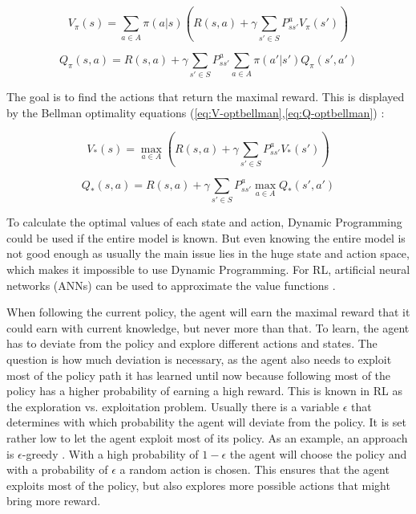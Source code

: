 \begin{equation}
\label{eq:V-bellman}
V_\pi (s) = \sum_{a \in A}  \pi(a|s) (R(s,a) + \gamma \sum_{s' \in S} P_{ss'}^a V_\pi (s'))
\end{equation}

\begin{equation}
\label{eq:Q-bellman}
Q_\pi (s,a) = R(s,a) + \gamma \sum_{s' \in S} P_{ss'}^a \sum_{a \in A}  \pi(a'|s') Q_\pi(s',a')
\end{equation}

The goal is to find the actions that return the maximal reward. This is displayed by the Bellman optimality equations (\ref{eq:V-optbellman},\ref{eq:Q-optbellman}) \cite{rllilianweng}:

\begin{equation}
\label{eq:V-optbellman}
V_\ast (s) = \max_{a \in A} (R(s,a) + \gamma \sum_{s' \in S} P_{ss'}^a V_\ast (s'))
\end{equation}

\begin{equation}
\label{eq:Q-optbellman}
Q_\ast (s,a) = R(s,a) + \gamma \sum_{s' \in S} P_{ss'}^a \max_{a \in A} Q_\ast(s',a')
\end{equation}

To calculate the optimal values of each state and action, Dynamic Programming could be used if the entire model is known. But even knowing the entire model is not good enough as usually the main issue lies in the huge state and action space, which makes it impossible to use Dynamic Programming. For RL, artificial neural networks (ANNs) can be used to approximate the value functions \cite{neuralnetpath}. 

When following the current policy, the agent will earn the maximal reward that it could earn with current knowledge, but never more than that. To learn, the agent has to deviate from the policy and explore different actions and states. The question is how much deviation is necessary, as the agent also needs to exploit most of the policy path it has learned until now because following most of the policy has a higher probability of earning a high reward. This is known in RL as the exploration vs. exploitation problem. Usually there is a variable $\epsilon$ that determines with which probability the agent will deviate from the policy. It is set rather low to let the agent exploit most of its policy. As an example, an approach is $\epsilon$-greedy \cite{egreedy}. With a high probability of $1-\epsilon$ the agent will choose the policy and with a probability of $\epsilon$ a random action is chosen. This ensures that the agent exploits most of the policy, but also explores more possible actions that might bring more reward. 

